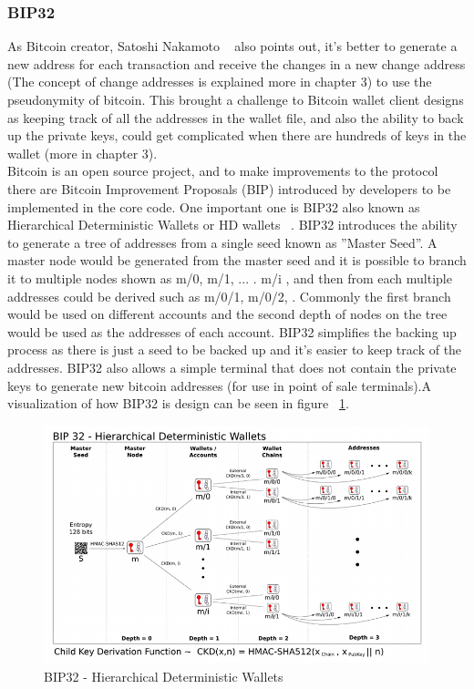 \subsubsection{BIP32}
As Bitcoin creator, Satoshi Nakamoto ~\cite{Nak08} also points out, it's better to generate a new address for each transaction and receive the changes in a new change address (The concept of change addresses is explained more in chapter 3) to use the pseudonymity of bitcoin. This brought a challenge to Bitcoin wallet client designs as keeping track of all the addresses in the wallet file, and also the ability to back up the private keys, could get complicated when there are hundreds of keys in the wallet (more in chapter 3). \\
Bitcoin is an open source project, and to make improvements to the protocol there are Bitcoin Improvement Proposals (BIP) introduced by developers to be implemented in the core code. One important one is BIP32 also known as Hierarchical Deterministic Wallets or HD wallets ~\cite{bip32}. BIP32 introduces the ability to generate a tree of addresses from a single seed known as ''Master Seed''. A master node would be generated from the master seed and it is possible to branch it to multiple nodes shown as m/0, m/1, ... . m/i , and then from each multiple addresses could be derived such as m/0/1, m/0/2, \etc. Commonly the first branch would be used on different accounts and the second depth of nodes on the tree would be used as the addresses of each account. BIP32 simplifies the backing up process as there is just a seed to be backed up and it's easier to keep track of the addresses. BIP32 also allows a simple terminal that does not contain the private keys to generate new bitcoin addresses (for use in point of sale terminals).A visualization of how BIP32 is design can be seen in figure ~\ref{fig:bip32}.

\begin{figure}
\centering
\includegraphics[width=\linewidth]{fig/bip32derivation.png}
  \caption{BIP32 - Hierarchical Deterministic Wallets ~\cite{bip32proposal}}
\label{fig:bip32}
\end{figure}


